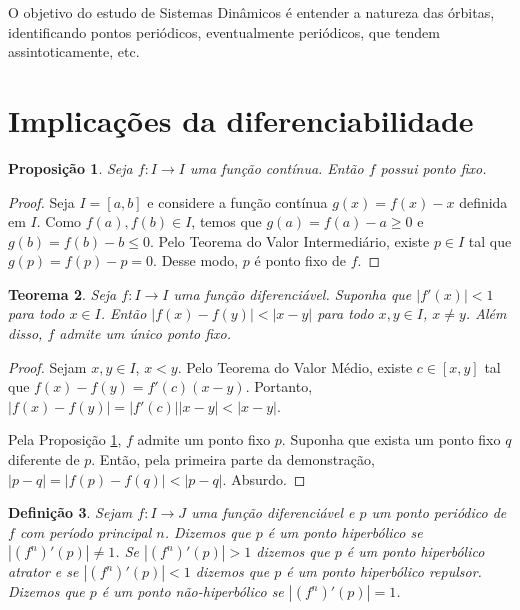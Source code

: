 \documentclass[a4paper, 12pt]{article}
\newtheorem{definition}{Definição}[section]
\newtheorem{theorem}[definition]{Teorema}
\newtheorem{proposition}[definition]{Proposição}
\begin{document}
O objetivo do estudo de Sistemas Dinâmicos é entender a natureza das órbitas, identificando pontos periódicos, eventualmente periódicos, que tendem assintoticamente, etc.

\section{Implicações da diferenciabilidade}
  
\begin{proposition}
\label{prop ponto fixo}
Seja $f: I \rightarrow I$ uma função contínua. Então $f$ possui ponto fixo.
\end{proposition}

\begin{proof}
Seja $I = [a, b]$ e considere a função contínua $g(x) = f(x) - x$ definida em $I$. Como $f(a), f(b) \in I$, temos que $g(a) = f(a) - a \geq 0$ e $g(b) = f(b) - b \leq 0$. Pelo Teorema do Valor Intermediário, existe $p \in I$ tal que $g(p) = f(p) -p = 0$. Desse modo, $p$ é ponto fixo de $f$.
\end{proof}

\begin{theorem}
\label{teo ponto fixo unico}
Seja $f:I \rightarrow I$ uma função diferenciável. Suponha que $|f'(x)|<1$ para todo $x \in I$. Então $|f(x) - f(y)| < |x - y|$ para todo $x, y \in I$, $x \neq y$. Além disso,  $f$ admite um único ponto fixo.
\end{theorem}

\begin{proof}
Sejam $x, y \in I$, $x < y$. Pelo Teorema do Valor Médio, existe $c \in [x, y]$ tal que $f(x) - f(y) = f'(c)(x - y)$. Portanto, $|f(x) - f(y)| = |f'(c)||x - y| < |x - y|$.

Pela Proposição \ref{prop ponto fixo}, $f$ admite um ponto fixo $p$. Suponha que exista um ponto fixo $q$ diferente de $p$. Então, pela primeira parte da demonstração, $|p - q| = |f(p) - f(q)| < |p - q|$. Absurdo.
\end{proof}

\begin{definition}
Sejam $f: I \rightarrow J$ uma função diferenciável e $p$ um ponto periódico de $f$ com período principal $n$. Dizemos que $p$ é um ponto hiperbólico se $|(f^n)'(p)| \neq 1$. Se $|(f^n)'(p)| > 1$ dizemos que $p$ é um ponto hiperbólico atrator e se $|(f^n)'(p)| < 1$ dizemos que $p$ é um ponto hiperbólico repulsor. Dizemos que $p$ é um ponto não-hiperbólico se $|(f^n)'(p)| = 1$.
\end{definition}
\end{document}
